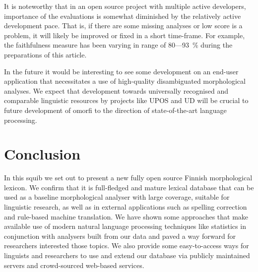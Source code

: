 \documentclass[a4paper,12pt]{article}
\newif\iffinal
\begin{document}
It is noteworthy that in an open source project with multiple active
developers, importance of the evaluations is somewhat diminished by the
relatively active development pace. That is, if there are some missing analyses
or low score is a problem, it will likely be improved or fixed in a short
time-frame. For example, the faithfulness measure has been varying in range of
80---93~\% during the preparations of this article.

In the future it would be interesting to see some development on an end-user
application that necessitates a use of high-quality disambiguated morphological
analyses. We expect that development towards universally recognised and
comparable linguistic resources by projects like UPOS and UD will be crucial
to future development of omorfi to the direction of state-of-the-art language
processing.


\section{Conclusion}
\label{sec:conclusion}

In this squib we set out to present a new fully open source Finnish
morphological lexicon. We confirm that it is full-fledged and mature lexical
database that can be used as a baseline morphological analyser with large
coverage, suitable for linguistic research, as well as in external applications
such as spelling correction and rule-based machine translation. We have shown
some approaches that make available use of modern natural language processing
techniques like statistics in conjunction with analysers built from our data
and paved a way forward for researchers interested those topics. We also
provide some easy-to-access ways for linguists and researchers to use and
extend our database via publicly maintained servers and crowd-sourced web-based
services.



\iffinal
\newpage
\begin{small}
    \noindent Contact Information:\\
\\
    Tommi A Pirinen\\
    Ollscoil Chathair Bhaile Átha Cliath\\
    Baile Átha Cliath 9\\
    Éire\\
    e-mail: \url{Tommi.Pirinen@computing.dcu.ie}\\
\end{small}
\fi
\end{document}
